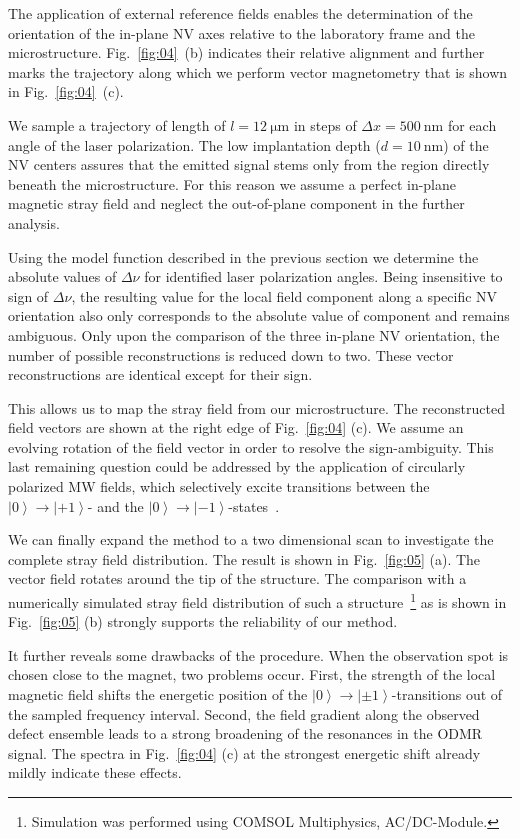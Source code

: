 \documentclass[
 reprint,
 amsmath,
 amssymb,
aps,
 prb,
showpacs
]{revtex4-1}
\newcommand{\ket}[1]{\left \vert #1 \right \rangle}
\begin{document}
The application of external reference fields enables the determination of the orientation of the in-plane NV axes relative to the laboratory frame and the microstructure. Fig.~\ref{fig:04}~(b) indicates their relative alignment and further marks the trajectory along which we perform vector magnetometry that is shown in Fig.~\ref{fig:04}~(c).

We sample a trajectory of length of $l=\SI{12}{\micro\meter}$ in steps of $\Delta x = \SI{500}{\nano\meter}$ for each angle of the laser polarization. The low implantation depth ($d=\SI{10}{\nano\meter}$) of the NV centers assures that the emitted signal stems only from the region directly beneath the microstructure. For this reason we assume a perfect in-plane magnetic stray field and neglect the out-of-plane component in the further analysis.

Using the model function described in the previous section we determine the absolute values of $\Delta \nu$ for identified laser polarization angles. Being insensitive to sign of $\Delta \nu$,  the resulting value for the local field component along a specific NV orientation also only corresponds to the absolute value of component and remains ambiguous. Only upon the comparison of the three in-plane NV orientation, the number of possible reconstructions is reduced down to two. These vector reconstructions are identical except for their sign.

This allows us to map the stray field from our microstructure. The reconstructed field vectors are shown at the right edge of Fig.~\ref{fig:04} (c). We assume an evolving rotation of the field vector in order to resolve the sign-ambiguity. This last remaining question could be addressed by the application of circularly polarized MW fields, which selectively excite transitions between the $\ket{0} \rightarrow \ket{+1}$- and the $\ket{0} \rightarrow \ket{-1}$-states~\cite{PhysRevB.76.165205}.

We can finally expand the method to a two dimensional scan to investigate the complete stray field distribution. The result is shown in Fig.~\ref{fig:05} (a). The vector field rotates around the tip of the structure. The comparison with a numerically simulated stray field distribution of such a structure~\footnote{Simulation was performed using COMSOL Multiphysics, AC/DC-Module.} as is shown in Fig.~\ref{fig:05} (b) strongly supports the reliability of our method.

It further reveals some drawbacks of the procedure. When the observation spot is chosen close to the magnet, two problems occur. First, the strength of the local magnetic field shifts the energetic position of the $\ket{0} \rightarrow \ket{\pm 1}$-transitions out of the sampled frequency interval. Second, the field gradient along the observed defect ensemble leads to a strong broadening of the resonances in the ODMR signal. The spectra in Fig.~\ref{fig:04} (c) at the strongest energetic shift already mildly indicate these effects.
\end{document}
